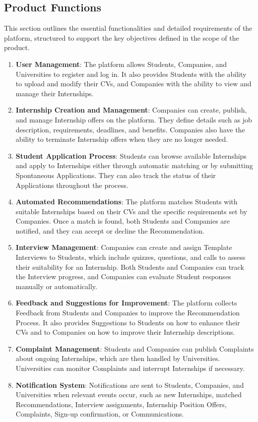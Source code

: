 \subsection{Product Functions}
This section outlines the essential functionalities and detailed requirements of the platform, structured to support the key objectives defined in the scope of the product.
\begin{enumerate}
    \item \textbf{User Management}: The platform allows Students, Companies, and Universities to register and log in. It also provides Students with the ability to upload and modify their CVs, and Companies with the ability to view and manage their Internships.
    \item \textbf{Internship Creation and Management}: Companies can create, publish, and manage Internship offers on the platform. They define details such as job description, requirements, deadlines, and benefits. Companies also have the ability to terminate Internship offers when they are no longer needed.
    \item \textbf{Student Application Process}: Students can browse available Internships and apply to Internships either through automatic matching or by submitting Spontaneous Applications. They can also track the status of their Applications throughout the process.
    \item \textbf{Automated Recommendations}: The platform matches Students with suitable Internships based on their CVs and the specific requirements set by Companies. Once a match is found, both Students and Companies are notified, and they can accept or decline the Recommendation.
    \item \textbf{Interview Management}: Companies can create and assign Template Interviews to Students, which include quizzes, questions, and calls to assess their suitability for an Internship. Both Students and Companies can track the Interview progress, and Companies can evaluate Student responses manually or automatically.
    \item \textbf{Feedback and Suggestions for Improvement}: The platform collects Feedback from Students and Companies to improve the Recommendation Process. It also provides Suggestions to Students on how to enhance their CVs and to Companies on how to improve their Internship descriptions.
    \item \textbf{Complaint Management}: Students and Companies can publish Complaints about ongoing Internships, which are then handled by Universities. Universities can monitor Complaints and interrupt Internships if necessary.
    \item \textbf{Notification System}: Notifications are sent to Students, Companies, and Universities when relevant events occur, such as new Internships, matched Recommendations, Interview assignments,  Internship Position Offers, Complaints, Sign-up confirmation, or Communications.
\end{enumerate}

